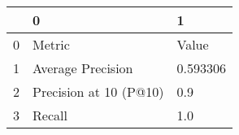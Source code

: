 \begin{tabular}{lll}
\toprule
{} &                       0 &         1 \\
\midrule
0 &                  Metric &     Value \\
1 &       Average Precision &  0.593306 \\
2 &  Precision at 10 (P@10) &       0.9 \\
3 &                  Recall &       1.0 \\
\bottomrule
\end{tabular}
